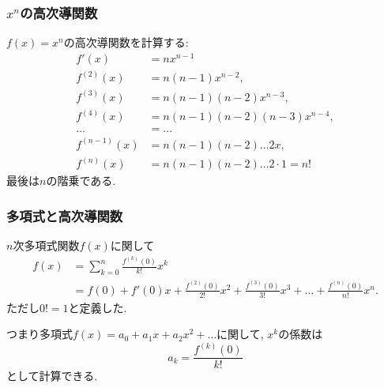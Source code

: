 




\begin{frame}
\frametitle{$x^n$の高次導関数}


$f(x)=x^n$の高次導関数を計算する: 
\begin{align*}
f'(x) & = nx^{n-1} \\
f^{(2)}(x) & =n(n-1)x^{n-2}, \\
f^{(3)}(x) & = n(n-1)(n-2)x^{n-3}, \\
f^{(4)}(x) & =  n(n-1)(n-2)(n-3)x^{n-4}, \\
\dots & = \dots \\
f^{(n-1)}(x) & =  n(n-1)(n-2) \dots 2x, \\
f^{(n)}(x) & =  n(n-1)(n-2) \dots 2\cdot 1=n! 
\end{align*}
最後は$n$の階乗である. 
\end{frame}








\begin{frame}
\frametitle{多項式と高次導関数}


\begin{Thm} \label{多項式の係数}
$n$次多項式関数$f(x)$に関して
\begin{align*}
f(x) & = \sum_{k=0}^n\frac{f^{(k)}(0)}{k!}x^k \\
& =  f(0)+ f'(0)x + \frac{f^{(2)}(0)}{2!}x^2 +  \frac{f^{(3)}(0)}{3!}x^3+ \dots + \frac{f^{(n)}(0)}{n!}x^n. 
\end{align*}
ただし$0!=1$と定義した. 
\end{Thm}
つまり多項式$f(x)=a_0+a_1x+a_2x^2+\dots$に関して, $x^k$の係数は
$$
a_k=\frac{f^{(k)}(0)}{k!} 
$$
として計算できる. 

\end{frame}








